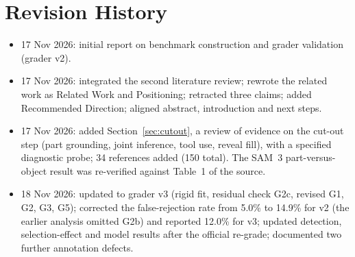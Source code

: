 \documentclass[11pt]{article}
\newcommand{\chk}[1]{\textsf{#1}}
\begin{document}
\section{Revision History}
\label{app:rev}
\begin{itemize}
\item 17 Nov 2026: initial report on benchmark construction and grader validation (grader v2).
\item 17 Nov 2026: integrated the second literature review; rewrote the related work as Related Work and Positioning; retracted three claims; added Recommended Direction; aligned abstract, introduction and next steps.
\item 17 Nov 2026: added Section~\ref{sec:cutout}, a review of evidence on the cut-out step (part grounding, joint inference, tool use, reveal fill), with a specified diagnostic probe; 34 references added (150 total). The SAM~3 part-versus-object result was re-verified against Table~1 of the source.
\item 18 Nov 2026: updated to grader v3 (rigid fit, residual check \chk{G2c}, revised \chk{G1}, \chk{G2}, \chk{G3}, \chk{G5}); corrected the false-rejection rate from 5.0\% to 14.9\% for v2 (the earlier analysis omitted \chk{G2b}) and reported 12.0\% for v3; updated detection, selection-effect and model results after the official re-grade; documented two further annotation defects.
\end{itemize}
\end{document}
